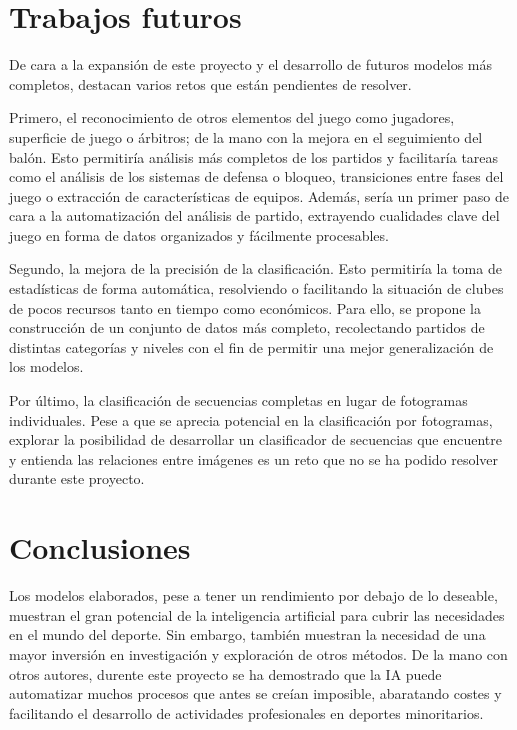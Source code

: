 \documentclass[12pt]{report} %
\begin{document}
    \chapter{Trabajos futuros}
    \label{chap:future}

    De cara a la expansión de este proyecto y el desarrollo de futuros modelos
    más completos, destacan varios retos que están pendientes de resolver.

    Primero, el reconocimiento de otros elementos del juego como jugadores,
    superficie de juego o árbitros; de la mano con la mejora en el seguimiento
    del balón. Esto permitiría análisis más completos de los partidos y
    facilitaría tareas como el análisis de los sistemas de defensa o bloqueo,
    transiciones entre fases del juego o extracción de características de
    equipos. Además, sería un primer paso de cara a la automatización del
    análisis de partido, extrayendo cualidades clave del juego en forma de
    datos organizados y fácilmente procesables.

    Segundo, la mejora de la precisión de la clasificación. Esto permitiría la
    toma de estadísticas de forma automática, resolviendo o facilitando la
    situación de clubes de pocos recursos tanto en tiempo como económicos. Para
    ello, se propone la construcción de un conjunto de datos más completo,
    recolectando partidos de distintas categorías y niveles con el fin de
    permitir una mejor generalización de los modelos.

    Por último, la clasificación de secuencias completas en lugar de fotogramas
    individuales. Pese a que se aprecia potencial en la clasificación por
    fotogramas, explorar la posibilidad de desarrollar un clasificador de
    secuencias que encuentre y entienda las relaciones entre imágenes es un
    reto que no se ha podido resolver durante este proyecto.
    

    \chapter{Conclusiones}
    \label{chap:conclusion}

    Los modelos elaborados, pese a tener un rendimiento por debajo de lo deseable, muestran el gran potencial de la inteligencia artificial para cubrir las necesidades en el mundo del deporte. Sin embargo, también muestran la necesidad de una mayor inversión en investigación y exploración de otros métodos. De la mano con otros autores, durente este proyecto se ha demostrado que la IA puede automatizar muchos procesos que antes se creían imposible, abaratando costes y facilitando el desarrollo de actividades profesionales en deportes minoritarios. 
\end{document}
